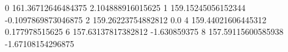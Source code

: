 0 161.36712646484375 2.104888916015625
1 159.15245056152344 -0.1097869873046875
2 159.26223754882812 0.0
4 159.44021606445312 0.177978515625
6 157.63137817382812 -1.630859375
8 157.59115600585938 -1.67108154296875
